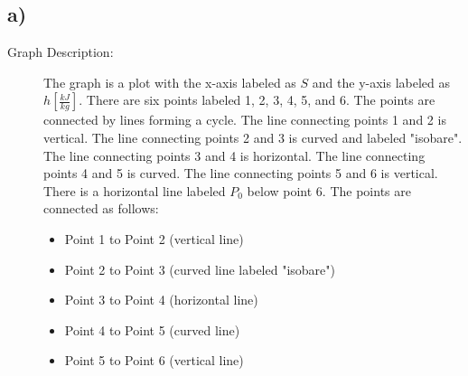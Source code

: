 

\subsection*{a)}

\begin{description}
    \item[Graph Description:] The graph is a plot with the x-axis labeled as $S$ and the y-axis labeled as $h \left[ \frac{kJ}{kg} \right]$. There are six points labeled 1, 2, 3, 4, 5, and 6. The points are connected by lines forming a cycle. The line connecting points 1 and 2 is vertical. The line connecting points 2 and 3 is curved and labeled "isobare". The line connecting points 3 and 4 is horizontal. The line connecting points 4 and 5 is curved. The line connecting points 5 and 6 is vertical. There is a horizontal line labeled $P_0$ below point 6. The points are connected as follows:
    \begin{itemize}
        \item Point 1 to Point 2 (vertical line)
        \item Point 2 to Point 3 (curved line labeled "isobare")
        \item Point 3 to Point 4 (horizontal line)
        \item Point 4 to Point 5 (curved line)
        \item Point 5 to Point 6 (vertical line)
    \end{itemize}
\end{description}